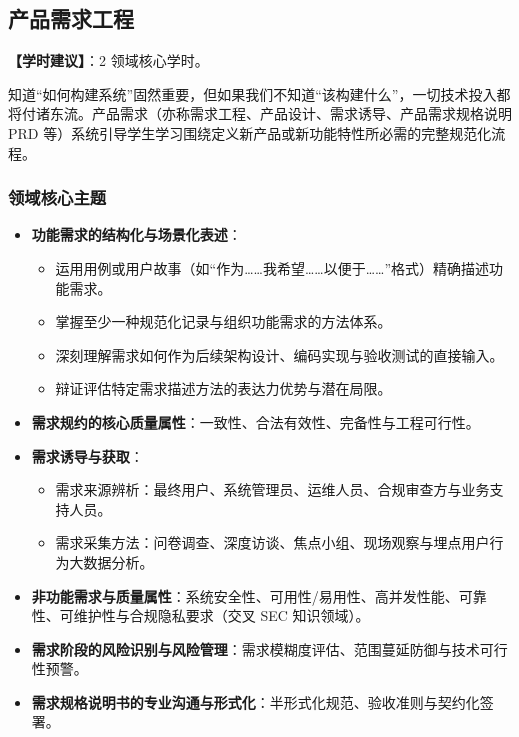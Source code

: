 \subsection{产品需求工程}
\textbf{【学时建议】}：2 领域核心学时。

知道“如何构建系统”固然重要，但如果我们不知道“该构建什么”，一切技术投入都将付诸东流。产品需求（亦称需求工程、产品设计、需求诱导、产品需求规格说明 PRD 等）系统引导学生学习围绕定义新产品或新功能特性所必需的完整规范化流程。

\subsubsection{领域核心主题}
\begin{itemize}
    \item \textbf{功能需求的结构化与场景化表述}：
    \begin{itemize}
        \item 运用用例或用户故事（如“作为……我希望……以便于……”格式）精确描述功能需求。
        \item 掌握至少一种规范化记录与组织功能需求的方法体系。
        \item 深刻理解需求如何作为后续架构设计、编码实现与验收测试的直接输入。
        \item 辩证评估特定需求描述方法的表达力优势与潜在局限。
    \end{itemize}
    \item \textbf{需求规约的核心质量属性}：一致性、合法有效性、完备性与工程可行性。
    \item \textbf{需求诱导与获取}：
    \begin{itemize}
        \item 需求来源辨析：最终用户、系统管理员、运维人员、合规审查方与业务支持人员。
        \item 需求采集方法：问卷调查、深度访谈、焦点小组、现场观察与埋点用户行为大数据分析。
    \end{itemize}
    \item \textbf{非功能需求与质量属性}：系统安全性、可用性/易用性、高并发性能、可靠性、可维护性与合规隐私要求（交叉 SEC 知识领域）。
    \item \textbf{需求阶段的风险识别与风险管理}：需求模糊度评估、范围蔓延防御与技术可行性预警。
    \item \textbf{需求规格说明书的专业沟通与形式化}：半形式化规范、验收准则与契约化签署。
\end{itemize}


